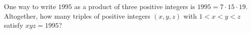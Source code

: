 One way to write $1995$ as a product of three positive integers is $1995=7\cdot15\cdot19$. Altogether, how many triples of positive integers $(x,y,z)$ with $1<x<y<z$ satisfy $xyz=1995$?
